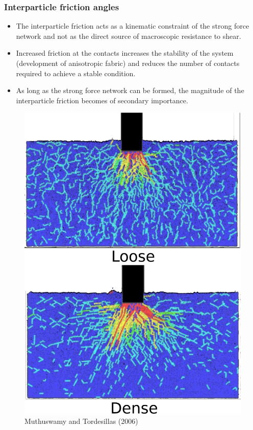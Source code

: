 \documentclass[notes]{beamer}
\begin{document}
\begin{frame}
\frametitle{Interparticle friction angles}
\noindent
\fboxsep=0pt
\noindent
\begin{minipage}[t]{0.65\linewidth}
	\begin{itemize}
		\item The interparticle friction acts as a kinematic
		constraint of the strong force network and not as
		the direct source of macroscopic resistance to
		shear.
		\item Increased friction at the contacts increases the
		stability of the system (development of
		anisotropic fabric) and reduces the number of
		contacts required to achieve a stable condition.
		\item As long as the strong force network can be
		formed, the magnitude of the interparticle friction
		becomes of secondary importance.
	\end{itemize}
\end{minipage}%
\hfill
\begin{minipage}[t]{0.35\linewidth}
	\begin{figure}
		\includegraphics[width=\textwidth]{figs/dem-force-chains-punch.png}
		\caption*{Muthuswamy and Tordesillas (2006)}
	\end{figure}
\end{minipage}
\end{frame}
\end{document}
